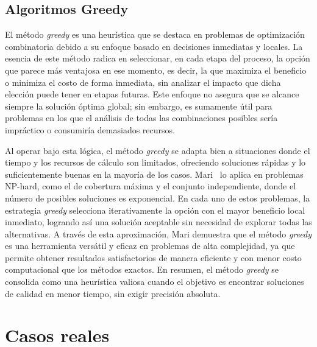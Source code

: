 \documentclass[9pt,a4paper,twoside]{rho-class/rho}
\begin{document}
        \subsection{Algoritmos Greedy}
            El método \textit{greedy} es una heurística que se destaca en problemas de optimización combinatoria debido a su enfoque basado en decisiones inmediatas y locales. La esencia de este método radica en seleccionar, en cada etapa del proceso, la opción que parece más ventajosa en ese momento, es decir, la que maximiza el beneficio o minimiza el costo de forma inmediata, sin analizar el impacto que dicha elección puede tener en etapas futuras. Este enfoque no asegura que se alcance siempre la solución óptima global; sin embargo, es sumamente útil para problemas en los que el análisis de todas las combinaciones posibles sería impráctico o consumiría demasiados recursos.
            \par\medskip
            Al operar bajo esta lógica, el método \textit{greedy} se adapta bien a situaciones donde el tiempo y los recursos de cálculo son limitados, ofreciendo soluciones rápidas y lo suficientemente buenas en la mayoría de los casos. Mari~\cite{Mari2020} lo aplica en problemas NP-hard, como el de cobertura máxima y el conjunto independiente, donde el número de posibles soluciones es exponencial. En cada uno de estos problemas, la estrategia \textit{greedy} selecciona iterativamente la opción con el mayor beneficio local inmediato, logrando así una solución aceptable sin necesidad de explorar todas las alternativas. A través de esta aproximación, Mari demuestra que el método \textit{greedy} es una herramienta versátil y eficaz en problemas de alta complejidad, ya que permite obtener resultados satisfactorios de manera eficiente y con menor costo computacional que los métodos exactos. En resumen, el método \textit{greedy} se consolida como una heurística valiosa cuando el objetivo es encontrar soluciones de calidad en menor tiempo, sin exigir precisión absoluta.
    
    \section{Casos reales}
\end{document}
